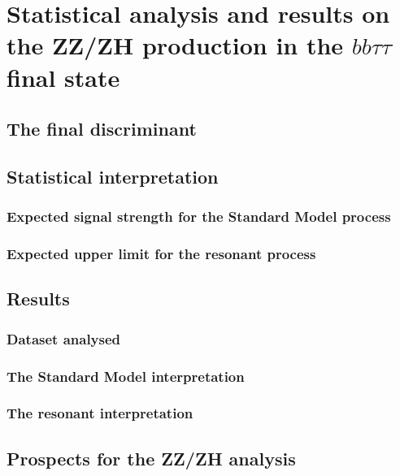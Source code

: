 \chapter{Statistical analysis and results on the ZZ/ZH production in the $bb\tau\tau$ final state}

\section{The final discriminant}

\section{Statistical interpretation}
\subsection{Expected signal strength for the Standard Model process}
\subsection{Expected upper limit for the resonant process}

\section{Results}
\subsection{Dataset analysed}
\subsection{The Standard Model interpretation}
\subsection{The resonant interpretation}

\section{Prospects for the ZZ/ZH analysis}
